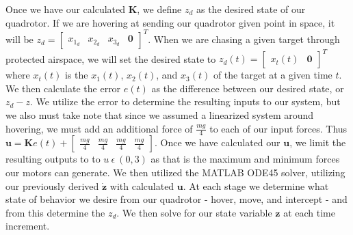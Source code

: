 \documentclass{article}
\begin{document}
\begin{multicols}{2}
Once we have our calculated $\boldsymbol{K}$, we define $z_d$ as the desired state of our quadrotor. If we are hovering at sending 
our quadrotor given point in space, it will be $z_d=\begin{bmatrix} x_{1_d} & x_{2_d} & x_{3_d} & \boldsymbol{0} 
\end{bmatrix}^T$. When we are chasing a given target through protected airspace, we will set the desired state to 
$z_d(t)=\begin{bmatrix} x_t(t) & \boldsymbol{0} \end{bmatrix}^T$ where $x_t(t)$ is the $x_1(t)$, $x_2(t)$, and $x_3(t)$ of the target at a given 
time $t$. We then calculate the error $e(t)$ as the difference between our desired state, or $z_d - z$. We utilize the error to 
determine the resulting inputs to our system, but we also must take note that since we assumed a linearized system around 
hovering, we must add an additional force of $\frac{mg}{4}$ to each of our input forces. Thus $\boldsymbol{u}= \boldsymbol{K}e(t) + 
\begin{bmatrix}\frac{mg}{4} & \frac{mg}{4} & \frac{mg}{4} & \frac{mg}{4}\end{bmatrix}$. 
Once we have calculated our $\boldsymbol{u}$, we limit the resulting outputs to to $u\  \epsilon\  (0, 3)$ as that is the maximum and 
minimum forces our motors can generate.
We then utilized the MATLAB ODE45 solver, utilizing our previously derived $\boldsymbol{\dot{z}}$ with calculated $
\boldsymbol{u}$. At each stage we determine what state of behavior we desire from our quadrotor - hover, move, and intercept - 
and from this determine the $z_d$. We then solve for our state variable $\boldsymbol{z}$ at each time increment.

\end{multicols}
\end{document}
